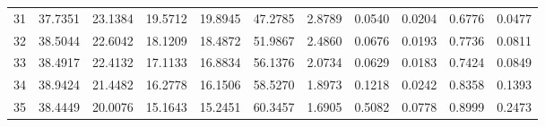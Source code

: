 \begin{table}[!htbp]
\begin{tabular}{rrrrrrrrrrr}
31 & 37.7351 & 23.1384 & 19.5712 & 19.8945 & 47.2785 & 2.8789 & 0.0540 & 0.0204 & 0.6776 & 0.0477 \\
32 & 38.5044 & 22.6042 & 18.1209 & 18.4872 & 51.9867 & 2.4860 & 0.0676 & 0.0193 & 0.7736 & 0.0811 \\
33 & 38.4917 & 22.4132 & 17.1133 & 16.8834 & 56.1376 & 2.0734 & 0.0629 & 0.0183 & 0.7424 & 0.0849 \\
34 & 38.9424 & 21.4482 & 16.2778 & 16.1506 & 58.5270 & 1.8973 & 0.1218 & 0.0242 & 0.8358 & 0.1393 \\
35 & 38.4449 & 20.0076 & 15.1643 & 15.2451 & 60.3457 & 1.6905 & 0.5082 & 0.0778 & 0.8999 & 0.2473 \\
\bottomrule
\end{tabular}
\end{table}
